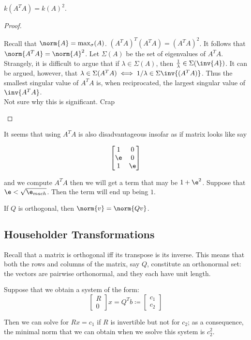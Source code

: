 \documentclass[../main.tex]{subfiles}
\begin{document}
\begin{proposition}
    $k(A^TA) = k(A)^2$.
\end{proposition}
\begin{proof}
    \begin{outline}
        \1 Recall that $\norm{A} = \max_{\sigma}(A)$.
        \1 $(A^TA)^T(A^TA) = (A^TA)^2$.
        \2 It follows that $\norm{A^TA} = \norm{A}^2$.
        \1 Let $\Sigma(A)$ be the set of eigenvalues of $A^TA$. Strangely, it is difficult to argue that if $\lambda \in \Sigma(A)$, then
        $\frac{1}{\lambda} \in \Sigma(\inv{A})$. It can be argued, however, that $\lambda \in \Sigma(A^TA) \iff 1/\lambda \in \Sigma{\inv{(A^TA)}}$. 
        Thus the smallest singular value of $A^TA$ is, when reciprocated, the largest singular value of $\inv{A^TA}$. \\
        Not sure why this is significant. Crap
    \end{outline}
\end{proof}
\begin{remark}
    It seems that using $A^TA$ is also disadvantageous insofar as if matrix looks like say

    \[
        \begin{bmatrix}
            1 & 0\\
            \e & 0\\
            1 & \e\\
        \end{bmatrix}
    \]

    and we compute $A^TA$ then we will get a term that may be $1 + \e^2$. Suppose that $\e < \sqrt{\e_{mach}}$. Then the term
    will end up being $1$.
\end{remark}
\begin{remark}
    If $Q$ is orthogonal, then $\norm{v} = \norm{Qv}$.
\end{remark}

\subsection{Householder Transformations}


\begin{remark}
    Recall that a matrix is orthogonal iff its transpose is its inverse.
    This means that both the rows and columns of the matrix, say $Q$, constitute an orthonormal set: the vectors are pairwise orthonormal, and they each have unit length.
\end{remark}
\begin{remark}
    Suppose that we obtain a system of the form:
    \[
        \begin{bmatrix}
            R \\
            0
        \end{bmatrix} x = Q^Tb \coloneq \begin{bmatrix}
            c_1 \\
            c_2
        \end{bmatrix}
    \]

    Then we can solve for $Rx = c_1$ if $R$ is invertible but not for $c_2$; as a consequence, the minimal norm that we can obtain when we ssolve this system is $c_2^2$.
\end{remark}
\end{document}
